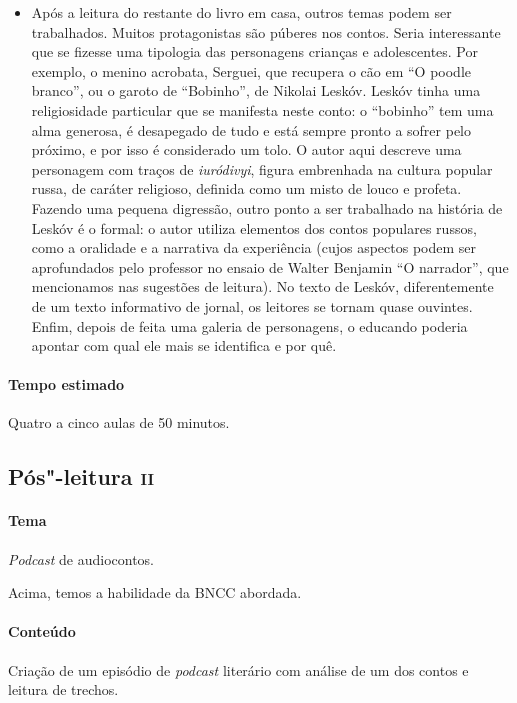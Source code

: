 \documentclass[11pt]{extarticle}
\begin{document}
\begin{itemize}
\item Após a leitura do restante do livro em casa, outros temas podem ser
trabalhados. Muitos protagonistas são púberes nos contos. Seria
interessante que se fizesse uma tipologia das personagens crianças e
adolescentes. Por exemplo, o menino acrobata, Serguei, que recupera o
cão em ``O poodle branco'', ou o garoto de ``Bobinho'', de Nikolai
Leskóv. Leskóv tinha uma religiosidade particular que se
manifesta neste conto: o ``bobinho'' tem uma alma generosa, é desapegado
de tudo e está sempre pronto a sofrer pelo próximo, e por isso é
considerado um tolo. O autor aqui descreve uma personagem com traços de
\emph{iuródivyi}, figura embrenhada na cultura popular russa, de caráter
religioso, definida como um misto de louco e profeta. Fazendo uma
pequena digressão, outro ponto a ser trabalhado na história de Leskóv é
o formal: o autor utiliza elementos dos contos populares russos, como a
oralidade e a narrativa da experiência (cujos aspectos podem ser
aprofundados pelo professor no ensaio de Walter Benjamin ``O
narrador'', que mencionamos nas sugestões de leitura). No texto de
Leskóv, diferentemente de um texto informativo de jornal, os leitores se
tornam quase ouvintes. Enfim, depois de feita uma galeria de
personagens, o educando poderia apontar com qual ele mais se identifica
e por quê.
\end{itemize}

\paragraph{Tempo estimado} Quatro a cinco aulas de 50 minutos.

\subsection{Pós"-leitura \textsc{ii}}

\paragraph{Tema} \emph{Podcast} de audiocontos.

Acima, temos a habilidade da BNCC abordada.

\paragraph{Conteúdo}
Criação de um episódio de \emph{podcast} literário com análise de um dos
contos e leitura de trechos.
\end{document}
